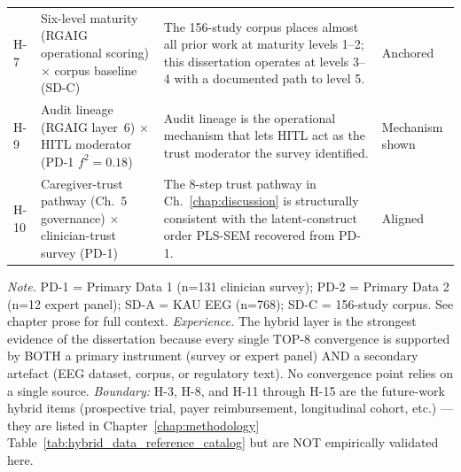 {\begin{xltabular}{\textwidth}{@{} >{\centering\arraybackslash}p{1.0cm} >{\raggedright\arraybackslash}p{4.8cm} p{6.5cm} >{\centering\arraybackslash}p{2.0cm} @{}}
H-7 & Six-level maturity (RGAIG operational scoring) $\times$ corpus baseline (SD-C) & The 156-study corpus places almost all prior work at maturity levels 1--2; this dissertation operates at levels 3--4 with a documented path to level 5. & Anchored \\
H-9 & Audit lineage (RGAIG layer~6) $\times$ HITL moderator (PD-1 $f^2{=}0.18$) & Audit lineage is the operational mechanism that lets HITL act as the trust moderator the survey identified. & Mechanism shown \\
H-10 & Caregiver-trust pathway (Ch.~5 governance) $\times$ clinician-trust survey (PD-1) & The 8-step trust pathway in Ch.~\ref{chap:discussion} is structurally consistent with the latent-construct order PLS-SEM recovered from PD-1. & Aligned \\
\end{xltabular}}
\vspace{0.3em}\noindent\textit{Note.} PD-1 = Primary Data 1 (n=131 clinician survey); PD-2 = Primary Data 2 (n=12 expert panel); SD-A = KAU EEG (n=768); SD-C = 156-study corpus. See chapter prose for full context.
\vspace{0.5em}\noindent\textit{Experience.} The hybrid layer is the strongest evidence of the dissertation because every single TOP-8 convergence is supported by BOTH a primary instrument (survey or expert panel) AND a secondary artefact (EEG dataset, corpus, or regulatory text). No convergence point relies on a single source. \emph{Boundary:} H-3, H-8, and H-11 through H-15 are the future-work hybrid items (prospective trial, payer reimbursement, longitudinal cohort, etc.) — they are listed in Chapter~\ref{chap:methodology} Table~\ref{tab:hybrid_data_reference_catalog} but are NOT empirically validated here.

